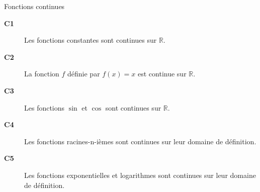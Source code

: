 \documentclass[a4paper,12pt]{article}
\begin{document}
\begin{coro}
	Fonctions continues
	\tcblower
	\noindent\begin{description}
		\item[{\bfseries C1}] Les fonctions constantes sont continues sur $\mathbb{R}$.  
		\item[{\bfseries C2}] La fonction $f$ définie par $f(x)=x$ est continue sur $\mathbb{R}$.  
		\item[{\bfseries C3}] Les fonctions $\sin$ et $\cos$ sont continues sur $\mathbb{R}$. 
		\item[{\bfseries C4}] Les fonctions racines-n-ièmes sont continues sur leur domaine de définition.
		\item[{\bfseries C5}] Les fonctions exponentielles et logarithmes sont continues sur leur domaine de définition. 
	\end{description}
\end{coro}
\end{document}
